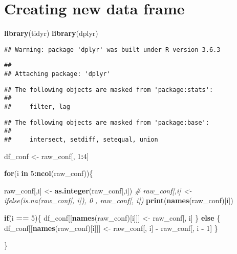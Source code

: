 \documentclass[
]{article}
\newenvironment{Shaded}{\begin{snugshade}}{\end{snugshade}}
\newcommand{\CommentTok}[1]{\textcolor[rgb]{0.56,0.35,0.01}{\textit{#1}}}
\newcommand{\ControlFlowTok}[1]{\textcolor[rgb]{0.13,0.29,0.53}{\textbf{#1}}}
\newcommand{\DecValTok}[1]{\textcolor[rgb]{0.00,0.00,0.81}{#1}}
\newcommand{\KeywordTok}[1]{\textcolor[rgb]{0.13,0.29,0.53}{\textbf{#1}}}
\newcommand{\NormalTok}[1]{#1}
\newcommand{\OperatorTok}[1]{\textcolor[rgb]{0.81,0.36,0.00}{\textbf{#1}}}
\newcommand{\StringTok}[1]{\textcolor[rgb]{0.31,0.60,0.02}{#1}}
\begin{document}
\hypertarget{creating-new-data-frame}{%
\section{Creating new data frame}\label{creating-new-data-frame}}

\begin{Shaded}
\begin{Highlighting}[]
\KeywordTok{library}\NormalTok{(tidyr)}
\KeywordTok{library}\NormalTok{(dplyr)}
\end{Highlighting}
\end{Shaded}

\begin{verbatim}
## Warning: package 'dplyr' was built under R version 3.6.3
\end{verbatim}

\begin{verbatim}
## 
## Attaching package: 'dplyr'
\end{verbatim}

\begin{verbatim}
## The following objects are masked from 'package:stats':
## 
##     filter, lag
\end{verbatim}

\begin{verbatim}
## The following objects are masked from 'package:base':
## 
##     intersect, setdiff, setequal, union
\end{verbatim}

\begin{Shaded}
\begin{Highlighting}[]
\NormalTok{df_conf <-}\StringTok{ }\NormalTok{raw_conf[, }\DecValTok{1}\OperatorTok{:}\DecValTok{4}\NormalTok{]}

\ControlFlowTok{for}\NormalTok{(i }\ControlFlowTok{in} \DecValTok{5}\OperatorTok{:}\KeywordTok{ncol}\NormalTok{(raw_conf))\{}

\NormalTok{  raw_conf[,i] <-}\StringTok{ }\KeywordTok{as.integer}\NormalTok{(raw_conf[,i])}
  \CommentTok{# raw_conf[,i] <- ifelse(is.na(raw_conf[, i]), 0 , raw_conf[, i])}
    \KeywordTok{print}\NormalTok{(}\KeywordTok{names}\NormalTok{(raw_conf)[i])}

  \ControlFlowTok{if}\NormalTok{(i }\OperatorTok{==}\StringTok{ }\DecValTok{5}\NormalTok{)\{}
\NormalTok{    df_conf[[}\KeywordTok{names}\NormalTok{(raw_conf)[i]]] <-}\StringTok{ }\NormalTok{raw_conf[, i]}
\NormalTok{  \} }\ControlFlowTok{else}\NormalTok{ \{}
\NormalTok{    df_conf[[}\KeywordTok{names}\NormalTok{(raw_conf)[i]]] <-}\StringTok{ }\NormalTok{raw_conf[, i] }\OperatorTok{-}\StringTok{ }\NormalTok{raw_conf[, i }\OperatorTok{-}\StringTok{ }\DecValTok{1}\NormalTok{]}
\NormalTok{  \}}


\NormalTok{\}}
\end{Highlighting}
\end{Shaded}
\end{document}
